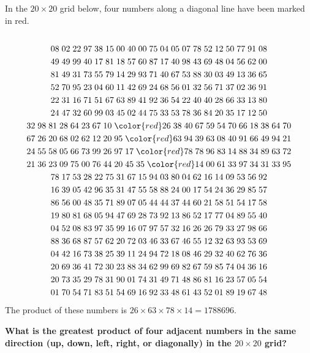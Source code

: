 \begin{problem}
In the $20\times20$ grid below, four numbers along a diagonal line have been marked in red.
\begin{multline*}\\
08\;02\;22\;97\;38\;15\;00\;40\;00\;75\;04\;05\;07\;78\;52\;12\;50\;77\;91\;08\\
49\;49\;99\;40\;17\;81\;18\;57\;60\;87\;17\;40\;98\;43\;69\;48\;04\;56\;62\;00\\
81\;49\;31\;73\;55\;79\;14\;29\;93\;71\;40\;67\;53\;88\;30\;03\;49\;13\;36\;65\\
52\;70\;95\;23\;04\;60\;11\;42\;69\;24\;68\;56\;01\;32\;56\;71\;37\;02\;36\;91\\
22\;31\;16\;71\;51\;67\;63\;89\;41\;92\;36\;54\;22\;40\;40\;28\;66\;33\;13\;80\\
24\;47\;32\;60\;99\;03\;45\;02\;44\;75\;33\;53\;78\;36\;84\;20\;35\;17\;12\;50\\
32\;98\;81\;28\;64\;23\;67\;10\;\begingroup\color{red}26\endgroup\;38\;40\;67\;59\;54\;70\;66\;18\;38\;64\;70\\
67\;26\;20\;68\;02\;62\;12\;20\;95\;\begingroup\color{red}63\endgroup\;94\;39\;63\;08\;40\;91\;66\;49\;94\;21\\
24\;55\;58\;05\;66\;73\;99\;26\;97\;17\;\begingroup\color{red}78\endgroup\;78\;96\;83\;14\;88\;34\;89\;63\;72\\
21\;36\;23\;09\;75\;00\;76\;44\;20\;45\;35\;\begingroup\color{red}14\endgroup\;00\;61\;33\;97\;34\;31\;33\;95\\
78\;17\;53\;28\;22\;75\;31\;67\;15\;94\;03\;80\;04\;62\;16\;14\;09\;53\;56\;92\\
16\;39\;05\;42\;96\;35\;31\;47\;55\;58\;88\;24\;00\;17\;54\;24\;36\;29\;85\;57\\
86\;56\;00\;48\;35\;71\;89\;07\;05\;44\;44\;37\;44\;60\;21\;58\;51\;54\;17\;58\\
19\;80\;81\;68\;05\;94\;47\;69\;28\;73\;92\;13\;86\;52\;17\;77\;04\;89\;55\;40\\
04\;52\;08\;83\;97\;35\;99\;16\;07\;97\;57\;32\;16\;26\;26\;79\;33\;27\;98\;66\\
88\;36\;68\;87\;57\;62\;20\;72\;03\;46\;33\;67\;46\;55\;12\;32\;63\;93\;53\;69\\
04\;42\;16\;73\;38\;25\;39\;11\;24\;94\;72\;18\;08\;46\;29\;32\;40\;62\;76\;36\\
20\;69\;36\;41\;72\;30\;23\;88\;34\;62\;99\;69\;82\;67\;59\;85\;74\;04\;36\;16\\
20\;73\;35\;29\;78\;31\;90\;01\;74\;31\;49\;71\;48\;86\;81\;16\;23\;57\;05\;54\\
01\;70\;54\;71\;83\;51\;54\;69\;16\;92\;33\;48\;61\;43\;52\;01\;89\;19\;67\;48\\
\end{multline*}
The product of these numbers is $26 \times 63 \times 78 \times 14 = 1788696$.

\textbf{What is the greatest product of four adjacent numbers in the same direction (up, down, left, right, or diagonally) in the $20\times20$ grid?}

\end{problem}	

